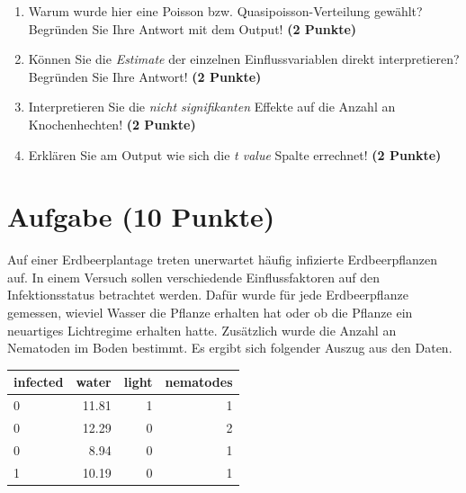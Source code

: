 \documentclass[a4paper, 10pt]{scrartcl}\usepackage[]{graphicx}\usepackage[]{xcolor}
\newenvironment{knitrout}{}{} %
\begin{document}
\begin{enumerate}
\item Warum wurde hier eine Poisson bzw. Quasipoisson-Verteilung gew{\"a}hlt?
  Begr{\"u}nden Sie Ihre Antwort mit dem \Rlogo Output! \textbf{(2 Punkte)}
\item K{\"o}nnen Sie die \textit{Estimate} der einzelnen Einflussvariablen
  direkt interpretieren? Begr{\"u}nden Sie Ihre Antwort! \textbf{(2 Punkte)}
\item Interpretieren Sie die \textit{nicht
      signifikanten} Effekte auf die Anzahl an Knochenhechten! \textbf{(2 Punkte)}
\item Erkl{\"a}ren Sie am \Rlogo Output wie sich die \textit{t value} Spalte
  errechnet! \textbf{(2 Punkte)}
\end{enumerate}
 
\clearpage

\section{Aufgabe \hfill (10 Punkte)}



Auf einer Erdbeerplantage treten unerwartet h{\"a}ufig infizierte
Erdbeerpflanzen auf. In einem Versuch sollen verschiedende Einflussfaktoren
auf den Infektionsstatus betrachtet werden. Daf{\"u}r wurde f{\"u}r jede
Erdbeerpflanze gemessen, wieviel Wasser die Pflanze erhalten hat oder ob
die Pflanze ein neuartiges Lichtregime erhalten hatte. Zus{\"a}tzlich wurde die
Anzahl an Nematoden im Boden bestimmt. Es ergibt sich folgender Auszug aus
den Daten.

\begin{knitrout}
\color{fgcolor}\begin{table}[!h]
\centering
\begin{tabular}{lrrr}
\toprule
infected & water & light & nematodes\\
\midrule
0 & 11.81 & 1 & 1\\
0 & 12.29 & 0 & 2\\
0 & 8.94 & 0 & 1\\
1 & 10.19 & 0 & 1\\
\bottomrule
\end{tabular}
\end{table}

\end{knitrout}
\end{document}
